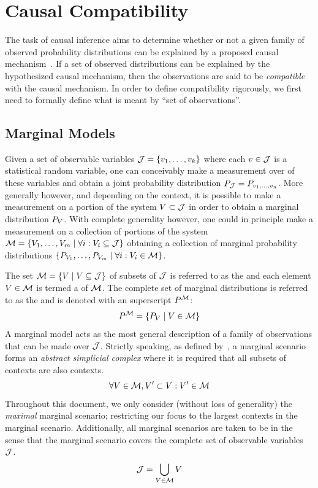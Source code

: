 \documentclass[aps, 10pt, english, twoside, pra, nofootinbib, tightenlines, longbibliography]{revtex4-1}
\begin{document}
    \section{Causal Compatibility}
    \label{sec:causal_compatibility}
    The task of causal inference aims to determine whether or not a given family of observed probability distributions can be explained by a proposed causal mechanism~\cite{Pearl_2009}. If a set of observed distributions can be explained by the hypothesized causal mechanism, then the observations are said to be \textit{compatible} with the causal mechanism. In order to define compatibility rigorously, we first need to formally define what is meant by ``set of observations''.

    \subsection{Marginal Models}
    Given a set of observable variables $\jointvar = \bc{v_1, \ldots, v_k}$ where each $v \in \mathcal{J}$ is a statistical random variable, one can conceivably make a measurement over of these variables and obtain a joint probability distribution $\prob[\jointvar] = \prob[v_1,\ldots,v_n]$. More generally however, and depending on the context, it is possible to make a measurement on a portion of the system $V \subset \mathcal{J}$ in order to obtain a marginal distribution $\prob[V]$. With complete generality however, one could in principle make a measurement on a collection of portions of the system $\mscenario = \bc{V_1, \ldots, V_m \mid \forall i : V_i \subseteq \jointvar}$ obtaining a collection of marginal probability distributions $\bc{\prob[V_1], \ldots, \prob[V_m] \mid \forall i: V_i \in \mscenario}$.

    The set $\mscenario = \bc{V \mid V \subseteq \jointvar}$ of subsets of $\mathcal{J}$ is referred to as the  and each element $V \in \mathcal{M}$ is termed a  of $\mathcal{M}$. The complete set of marginal distributions is referred to as the  and is denoted with an superscript $\prob^{\mscenario}$:
    \[ \prob^{\mscenario} = \bc{\prob[V] \mid V \in \mscenario} \]
    A marginal model acts as the most general description of a family of observations that can be made over $\mathcal{J}$. Strictly speaking, as defined by~\cite{Fritz_2011}, a marginal scenario forms an \textit{abstract simplicial complex} where it is required that all subsets of contexts are also contexts.
    \[ \forall V \in \mathcal{M}, V' \subset V : V' \in \mathcal{M} \]
    Throughout this document, we only consider (without loss of generality) the \textit{maximal} marginal scenario; restricting our focus to the largest contexts in the marginal scenario. Additionally, all marginal scenarios are taken to be  in the sense that the marginal scenario covers the complete set of observable variables $\mathcal{J}$.
    \[ \mathcal{J} = \bigcup_{V \in \mathcal{M}} V \]
\end{document}
